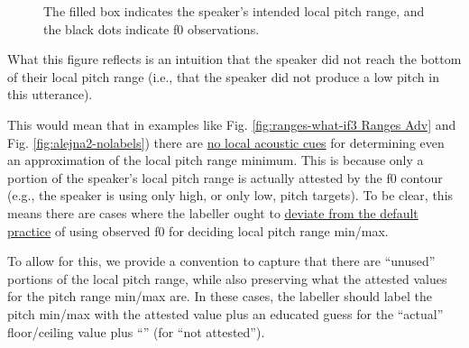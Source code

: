 \documentclass[11pt, twoside]{memoir}
\def\textlabel#1{{\relsize{-.5}\fontspec[Mapping=tex-text]{Roboto Mono}{#1}}}
\begin{document}
\begin{figure}[H]
\centering
{}
\caption{The filled box indicates the speaker’s intended local pitch range, and the black dots indicate f0 observations.%
\label{fig:ranges intuition alejna2}%
}
\end{figure}

What this figure reflects is an intuition that the speaker did not reach the bottom of their local pitch range (i.e., that the speaker did not produce a low pitch in this utterance).

This would mean that in examples like Fig. \ref{fig:ranges-what-if3 Ranges Adv} and Fig. \ref{fig:alejna2-nolabels}) there are \uline{no local acoustic cues} for determining even an approximation of the local pitch range minimum. This is because only a portion of the speaker’s local pitch range is actually attested by the f0 contour (e.g., the speaker is using only high, or only low, pitch targets). To be clear, this means there are cases where the labeller ought to \uline{deviate from the default practice} of using observed f0 for deciding local pitch range min\slash max.

To allow for this, we provide a convention to capture that there are “unused” portions of the local pitch range, while also preserving what the attested values for the pitch range min\slash max are. In these cases, the labeller should label the pitch min\slash max with the attested value plus an educated guess for the “actual” floor\slash ceiling value plus “\textlabel{:na}” (for “not attested”).
\end{document}
